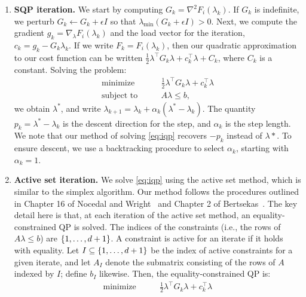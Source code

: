 \documentclass[eikonal.tex]{subfiles}
\begin{document}
\begin{enumerate}
\item \textbf{SQP iteration.} We start by computing
  $G_k = \nabla^2 F_i(\lambda_k)$. If $G_k$ is indefinite, we perturb
  $G_k \gets G_k + \epsilon I$ so that
  $\lambda_{\operatorname{min}}(G_k + \epsilon I) > 0$. Next, we
  compute the gradient $g_k = \nabla_\lambda F_i(\lambda_k)$ and the
  load vector for the iteration, $c_k = g_k - G_k \lambda_k$. If
  we write $F_k = F_i(\lambda_k)$, then our quadratic approximation to
  our cost function can be written
  $\tfrac{1}{2} \lambda^\top G_k \lambda + c_k^\top \lambda + C_k$,
  where $C_k$ is a constant. Solving the problem:
  \begin{equation}\label{eq:iqp}
    \begin{aligned}
      \mbox{minimize} & \qquad \frac{1}{2} \lambda^\top G_k \lambda + c_k^\top \lambda \\
      \mbox{subject to} & \qquad A\lambda \leq b,
    \end{aligned}
  \end{equation}
  we obtain $\lambda^*$, and write
  $\lambda_{k+1} = \lambda_k + \alpha_k (\lambda^* - \lambda_k)$. The
  quantity $p_k = \lambda^* - \lambda_k$ is the descent direction for
  the step, and $\alpha_k$ is the step length. We note that our method
  of solving \cref{eq:iqp} recovers $-p_k$ instead of $\lambda*$. To
  ensure descent, we use a backtracking procedure to select
  $\alpha_k$, starting with $\alpha_k = 1$.
\item \textbf{Active set iteration.} We solve \cref{eq:iqp} using the
  active set method, which is similar to the simplex algorithm. Our
  method follows the procedures outlined in Chapter 16 of Nocedal and
  Wright~\cite{nocedal2006numerical} and Chapter 2 of
  Bertsekas~\cite{bertsekas1999nonlinear}. The key detail here is
  that, at each iteration of the active set method, an
  equality-constrained QP is solved. The indices of the constraints
  (i.e., the rows of $A \lambda \leq b$) are $\left\{1, \hdots, d +
    1\right\}$. A constraint is active for an iterate if it holds with
  equality. Let $I \subseteq \left\{1, \hdots, d + 1\right\}$ be the index of
  active constraints for a given iterate, and let $A_I$ denote the
  submatrix consisting of the rows of $A$ indexed by $I$; define $b_I$
  likewise. Then, the equality-constrained QP is:
  \begin{equation}
    \label{eq:eqp}
    \begin{aligned}
      \mbox{minimize} & \qquad \frac{1}{2} \lambda^\top G_k \lambda + c_k^\top \lambda \\

\end{aligned}
\end{equation}
\end{enumerate}
\end{document}
